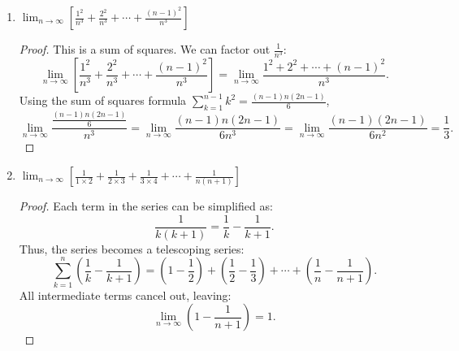\begin{solution}
\begin{enumerate}
    \item $\lim_{n \to \infty} \left[ \frac{1^2}{n^3} + \frac{2^2}{n^3} + \cdots + \frac{(n-1)^2}{n^3} \right]$
    \begin{proof}
    This is a sum of squares. We can factor out $\frac{1}{n^3}$:
    \[
    \lim_{n \to \infty} \left[ \frac{1^2}{n^3} + \frac{2^2}{n^3} + \cdots + \frac{(n-1)^2}{n^3} \right] = \lim_{n \to \infty} \frac{1^2 + 2^2 + \cdots + (n-1)^2}{n^3}.
    \]
    Using the sum of squares formula $\sum_{k=1}^{n-1} k^2 = \frac{(n-1)n(2n-1)}{6}$,
    \[
    \lim_{n \to \infty} \frac{\frac{(n-1)n(2n-1)}{6}}{n^3} = \lim_{n \to \infty} \frac{(n-1)n(2n-1)}{6n^3} = \lim_{n \to \infty} \frac{(n-1)(2n-1)}{6n^2} = \frac{1}{3}.
    \]
    \end{proof}

    \item $\lim_{n \to \infty} \left[ \frac{1}{1 \times 2} + \frac{1}{2 \times 3} + \frac{1}{3 \times 4} + \cdots + \frac{1}{n(n+1)} \right]$
    \begin{proof}
    Each term in the series can be simplified as:
    \[
    \frac{1}{k(k+1)} = \frac{1}{k} - \frac{1}{k+1}.
    \]
    Thus, the series becomes a telescoping series:
    \[
    \sum_{k=1}^{n} \left( \frac{1}{k} - \frac{1}{k+1} \right) = \left( 1 - \frac{1}{2} \right) + \left( \frac{1}{2} - \frac{1}{3} \right) + \cdots + \left( \frac{1}{n} - \frac{1}{n+1} \right).
    \]
    All intermediate terms cancel out, leaving:
    \[
    \lim_{n \to \infty} \left( 1 - \frac{1}{n+1} \right) = 1.
    \]
    \end{proof}
\end{enumerate}
\end{solution}


